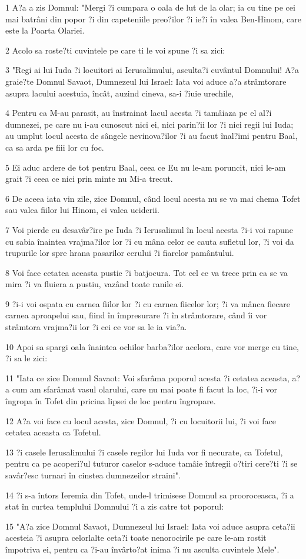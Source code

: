 \par 1 A?a a zis Domnul: "Mergi ?i cumpara o oala de lut de la olar; ia cu tine pe cei mai batrâni din popor ?i din capeteniile preo?ilor ?i ie?i în valea Ben-Hinom, care este la Poarta Olariei.
\par 2 Acolo sa roste?ti cuvintele pe care ti le voi spune ?i sa zici:
\par 3 "Regi ai lui Iuda ?i locuitori ai Ierusalimului, asculta?i cuvântul Domnului! A?a graie?te Domnul Savaot, Dumnezeul lui Israel: Iata voi aduce a?a strâmtorare asupra lacului acestuia, încât, auzind cineva, sa-i ?iuie urechile,
\par 4 Pentru ca M-au parasit, au înstrainat lacul acesta ?i tamâiaza pe el al?i dumnezei, pe care nu i-au cunoscut nici ei, nici parin?ii lor ?i nici regii lui Iuda; au umplut locul acesta de sângele nevinova?ilor ?i au facut înal?imi pentru Baal, ca sa arda pe fiii lor cu foc.
\par 5 Ei aduc ardere de tot pentru Baal, ceea ce Eu nu le-am poruncit, nici le-am grait ?i ceea ce nici prin minte nu Mi-a trecut.
\par 6 De aceea iata vin zile, zice Domnul, când locul acesta nu se va mai chema Tofet sau valea fiilor lui Hinom, ci valea uciderii.
\par 7 Voi pierde cu desavâr?ire pe Iuda ?i Ierusalimul în locul acesta ?i-i voi rapune cu sabia înaintea vrajma?ilor lor ?i cu mâna celor ce cauta sufletul lor, ?i voi da trupurile lor spre hrana pasarilor cerului ?i fiarelor pamântului.
\par 8 Voi face cetatea aceasta pustie ?i batjocura. Tot cel ce va trece prin ea se va mira ?i va fluiera a pustiu, vazând toate ranile ei.
\par 9 ?i-i voi ospata cu carnea fiilor lor ?i cu carnea fiicelor lor; ?i va mânca fiecare carnea aproapelui sau, fiind în împresurare ?i în strâmtorare, când îi vor strâmtora vrajma?ii lor ?i cei ce vor sa le ia via?a.
\par 10 Apoi sa spargi oala înaintea ochilor barba?ilor acelora, care vor merge cu tine, ?i sa le zici:
\par 11 "Iata ce zice Domnul Savaot: Voi sfarâma poporul acesta ?i cetatea aceasta, a?a cum am sfarâmat vasul olarului, care nu mai poate fi facut la loc, ?i-i vor îngropa în Tofet din pricina lipsei de loc pentru îngropare.
\par 12 A?a voi face cu locul acesta, zice Domnul, ?i cu locuitorii lui, ?i voi face cetatea aceasta ca Tofetul.
\par 13 ?i casele Ierusalimului ?i casele regilor lui Iuda vor fi necurate, ca Tofetul, pentru ca pe acoperi?ul tuturor caselor s-aduce tamâie întregii o?tiri cere?ti ?i se savâr?esc turnari în cinstea dumnezeilor straini".
\par 14 ?i s-a întors Ieremia din Tofet, unde-l trimisese Domnul sa prooroceasca, ?i a stat în curtea templului Domnului ?i a zis catre tot poporul:
\par 15 "A?a zice Domnul Savaot, Dumnezeul lui Israel: Iata voi aduce asupra ceta?ii acesteia ?i asupra celorlalte ceta?i toate nenorocirile pe care le-am rostit împotriva ei, pentru ca ?i-au învârto?at inima ?i nu asculta cuvintele Mele".

